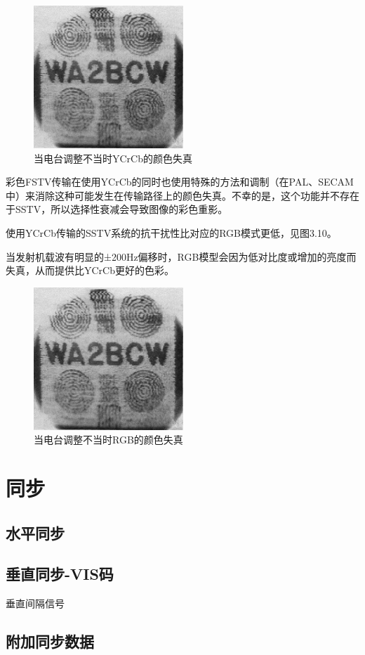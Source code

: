 \begin{figure}
	\centering
	\includegraphics[width=0.7\linewidth]{figs/obrazek1.png}
	\caption{当电台调整不当时YCrCb的颜色失真}
\end{figure}

彩色FSTV传输在使用YCrCb的同时也使用特殊的方法和调制（在PAL、SECAM中）来消除这种可能发生在传输路径上的颜色失真。不幸的是，这个功能并不存在于SSTV，所以选择性衰减会导致图像的彩色重影。

使用YCrCb传输的SSTV系统的抗干扰性比对应的RGB模式更低，见图3.10。

当发射机载波有明显的±200Hz偏移时，RGB模型会因为低对比度或增加的亮度而失真，从而提供比YCrCb更好的色彩。

\begin{figure}
	\centering
	\includegraphics[width=0.7\linewidth]{figs/obrazek1.png}
	\caption{当电台调整不当时RGB的颜色失真}
\end{figure}


\section{同步}

\subsection{水平同步}

\subsection{垂直同步-VIS码}
垂直间隔信号

\subsection{附加同步数据}